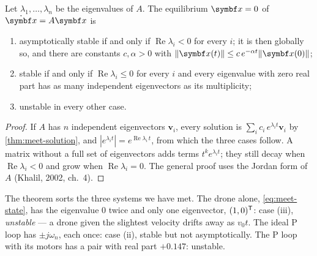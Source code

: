 \begin{theorem}
\label{thm:spring-linear}
Let $\lambda_1, \dots, \lambda_n$ be the eigenvalues of $A$. The equilibrium $\vx = 0$ of $\dot{\vx} = A\vx$ is
\begin{enumerate}[label=(\roman*)]
  \item asymptotically stable if and only if $\operatorname{Re}\lambda_i < 0$ for every $i$; it is then globally so, and there are constants $c, \alpha > 0$ with $\|\vx(t)\| \le c\,e^{-\alpha t}\|\vx(0)\|$;
  \item stable if and only if $\operatorname{Re}\lambda_i \le 0$ for every $i$ and every eigenvalue with zero real part has as many independent eigenvectors as its multiplicity;
  \item unstable in every other case.
\end{enumerate}
\end{theorem}
\begin{proof}
If $A$ has $n$ independent eigenvectors $\symbf v_i$, every solution is $\sum_i c_i\,e^{\lambda_i t}\symbf v_i$ by \cref{thm:meet-solution}, and $|e^{\lambda_i t}| = e^{\operatorname{Re}\lambda_i\,t}$, from which the three cases follow. A matrix without a full set of eigenvectors adds terms $t^k e^{\lambda_i t}$; they still decay when $\operatorname{Re}\lambda_i < 0$ and grow when $\operatorname{Re}\lambda_i = 0$. The general proof uses the Jordan form of $A$ (Khalil, 2002, ch.~4).
\end{proof}

The theorem sorts the three systems we have met. The drone alone, \cref{eq:meet-state}, has the eigenvalue $0$ twice and only one eigenvector, $(1, 0)^{\mathsf{T}}$: case (iii), \emph{unstable} — a drone given the slightest velocity drifts away as $v_0 t$. The ideal P loop has $\pm j\omega_n$, each once: case (ii), stable but not asymptotically. The P loop with its motors has a pair with real part $+0.147$: unstable.

